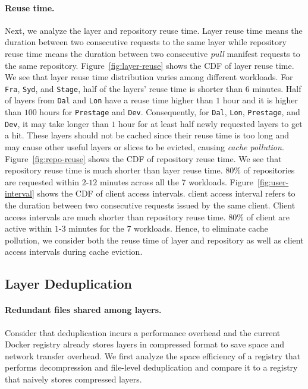 \paragraph{Reuse time.}
Next, we analyze the layer and repository reuse time.
Layer reuse time means the duration between two consecutive requests to the same layer
while repository reuse time means the duration between two consecutive \emph{pull} manifest requests to the same repository.
Figure~\ref{fig:layer-reuse} shows the CDF of layer reuse time. 
We see that layer reuse time distribution varies among different workloads.
For \texttt{Fra}, \texttt{Syd}, and \texttt{Stage},
half of the layers' reuse time is shorter than $6$ minutes.
Half of layers from \texttt{Dal} and \texttt{Lon} have a reuse time higher than $1$ hour and it is higher than $100$ hours for \texttt{Prestage} and \texttt{Dev}.
Consequently, for \texttt{Dal}, \texttt{Lon}, \texttt{Prestage}, and \texttt{Dev}, 
it may take longer than $1$ hour for at least half newly requested layers to get a hit. 
These layers should not be cached since their reuse time is too long and may cause other useful layers or slices to be evicted, \ie causing \emph{cache pollution}.
Figure~\ref{fig:repo-reuse} shows the CDF of repository reuse time.
We see that repository reuse time is much shorter than layer reuse time.
$80$\% of repositories are requested within $2$-$12$ minutes across all the 7 workloads.
Figure~\ref{fig:user-interval} shows the CDF of client access intervals.
client access interval refers to the duration between two consecutive requests issued by the same client.
Client access intervals are much shorter than repository reuse time.
$80$\% of client are active within $1$-$3$ minutes for the 7 workloads. 
Hence, to eliminate cache pollution,
we consider both the reuse time of layer and repository as well as client access intervals during cache eviction.

\subsection{Layer Deduplication}

\paragraph{Redundant files shared among layers.}
Consider that deduplication incurs a performance overhead and the current Docker registry already stores layers in compressed format to save space and network transfer overhead. We first analyze the space efficiency of a registry that performs decompression and file-level deduplication and compare it to a registry that naively stores compressed layers.

